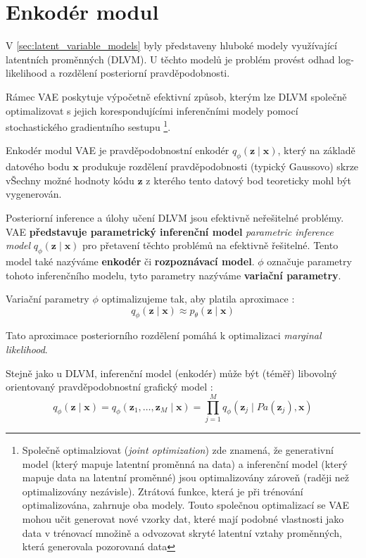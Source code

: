 \section{Enkodér modul}
\label{sec:vae_encoder}
V \autoref{sec:latent_variable_models} byly představeny hluboké modely využívající latentních proměnných (DLVM).
U těchto modelů je problém provést odhad log-likelihood a rozdělení posteriorní pravděpodobnosti.

Rámec VAE poskytuje výpočetně efektivní způsob, kterým lze DLVM společně optimalizovat s jejich korespondujícími inferenčními modely pomocí stochastického gradientního sestupu
\footnote{Společně optimalziovat (\emph{joint optimization}) zde znamená, že generativní model (který mapuje latentní proměnná na data) a inferenční model (který mapuje data na latentní proměnné) jsou optimalizovány zároveň (raději než optimalizovány nezávisle). Ztrátová funkce, která je při trénování optimalizována, zahrnuje oba modely. Touto společnou optimalizací se VAE mohou učit generovat nové vzorky dat, které mají podobné vlastnosti jako data v trénovací množině a odvozovat skryté latentní vztahy proměnných, která generovala pozorovaná data}.

Enkodér modul VAE je pravděpodobnostní enkodér $q_\phi(\textbf{z}\mid\textbf{x})$, který na základě datového bodu $\textbf{x}$ produkuje rozdělení pravděpodobnosti (typický Gaussovo) skrze vŠechny možné hodnoty kódu $\mathbf{z}$ z kterého tento datový bod teoreticky mohl být vygenerován.

Posteriorní inference a úlohy učení DLVM jsou efektivně neřešitelné problémy.
VAE \textbf{představuje parametrický inferenční model} \emph{parametric inference model} $q_\phi(\textbf{z}\mid\textbf{x})$ pro přetavení těchto problémů na efektivně řešitelné.
Tento model také nazýváme \textbf{enkodér} či \textbf{rozpoznávací model}.
$\phi$ označuje parametry tohoto inferenčního modelu, tyto parametry nazýváme \textbf{variační parametry}. \cite{Kingma2019}


Variační parametry $\phi$ optimalizujeme tak, aby platila aproximace \cite{Kingma2014}:
\begin{equation}
    q_\phi(\textbf{z}\mid\textbf{x}) \approx p_\theta(\textbf{z}\mid\textbf{x})
\end{equation}

Tato aproximace posteriorního rozdělení pomáhá k optimalizaci \emph{marginal likelihood}.

Stejně jako u DLVM, inferenční model (enkodér) může být (téměř) libovolný orientovaný pravděpodobnostní grafický model \cite{Kingma2019}:
\begin{equation}
    q_\phi(\textbf{z}\mid\textbf{x}) = q_\phi(\textbf{z}_1,\dots,\textbf{z}_M\mid\textbf{x}) = \prod_{j=1}^{M} q_\phi(\textbf{z}_j\mid Pa(\textbf{z}_j), \textbf{x})
\end{equation}

